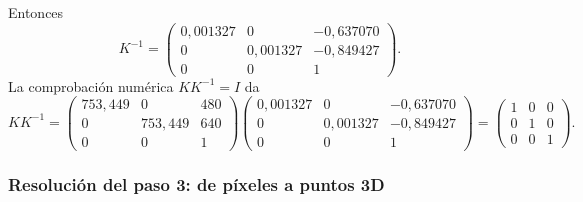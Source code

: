 Entonces
\begin{equation}
K^{-1}=\begin{pmatrix} 0{,}001327 & 0 & -0{,}637070 \\ 0 & 0{,}001327 & -0{,}849427 \\ 0 & 0 & 1 \end{pmatrix} .
\end{equation}
La comprobación numérica $KK^{-1}=I$ da
\begin{equation}
KK^{-1}=\begin{pmatrix} 753{,}449 & 0 & 480 \\ 0 & 753{,}449 & 640 \\ 0 & 0 & 1 \end{pmatrix}\begin{pmatrix} 0{,}001327 & 0 & -0{,}637070 \\ 0 & 0{,}001327 & -0{,}849427 \\ 0 & 0 & 1 \end{pmatrix}=\begin{pmatrix} 1 & 0 & 0 \\ 0 & 1 & 0 \\ 0 & 0 & 1 \end{pmatrix} .
\end{equation}


\subsubsection{Resolución del paso 3: de píxeles a puntos 3D}\label{sec:casco-retro}

